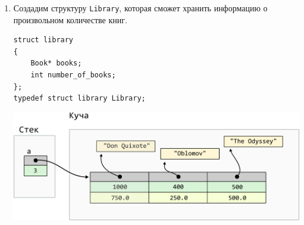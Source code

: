 \documentclass[10pt]{article}
\newcommand{\mallocImagesScale}{0.72}
\begin{document}
\begin{enumerate}

\item Создадим структуру \texttt{Library}, которая сможет хранить информацию о произвольном количестве книг.
\begin{lstlisting}
struct library 
{
    Book* books;
    int number_of_books;
};
typedef struct library Library;
\end{lstlisting}

\begin{center}
\includegraphics[scale=\mallocImagesScale]{../images/malloc_homework/09stack_struct_book_library.png}
\end{center}


\end{enumerate}
\end{document}
